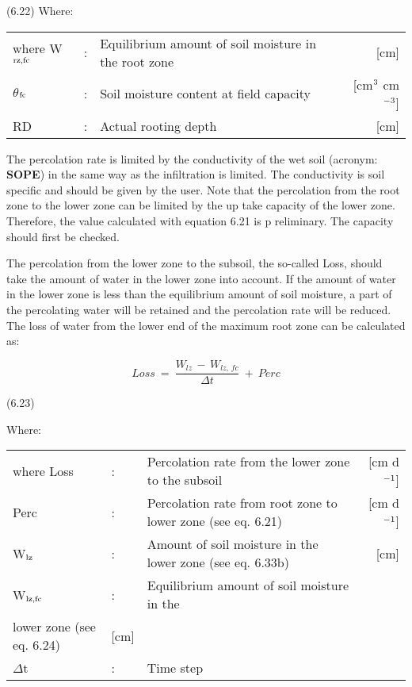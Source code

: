  
\strut\hfill (6.22)
Where:\\
\begin{tabularx}{\textwidth}{llXr}



where W$_{{\rm rz,fc}}$ &:& Equilibrium amount of soil moisture in the root zone  & [cm]\\
$\theta$$_{{\rm fc}}$ &:& Soil moisture content at field capacity  & [cm$^{{\rm 3}}$ cm$^{{\rm -3}}$]\\
RD &:& Actual rooting depth  & [cm]
\end{tabularx}



The percolation rate is limited by the conduc\-tivity of the wet soil (acronym: {\bf SOPE}) in the
same way as the infiltration is limited. The conductivity is soil specific and should be
given by the user. Note that the percolation from the root zone to the lower zone can be
limited by the up take capacity of the lower zone. Therefore, the value calculated with 
equation 6.21 is p reliminary. The capacity should first be checked.



The percolation from the lower zone to the subsoil, the so-called Loss, should take the
amount of water in the lower zone into account. If the amount of water in the lower zone
is less than the equilibrium amount of soil moisture, a part of the percolating water will
be retained and the percolation rate will be reduced. The loss of water from the lower end
of the maximum root zone can be calculated as:

\begin{equation}
Loss ~=~{\frac{W _{lz} \, -\, W _{lz,\, fc} }{\Delta t}} ~+~ Perc
\end{equation}

 
\strut\hfill (6.23)

Where:\\
\begin{tabularx}{\textwidth}{llXr}



where Loss &:& Percolation rate from the lower zone to the subsoil   & [cm d$^{{\rm -1}}$]\\
Perc &:& Percolation rate from root zone to lower zone (see eq. 6.21)  & [cm d$^{{\rm -1}}$]\\
W$_{{\rm lz}}$ &:& Amount of soil moisture in the lower zone (see eq. 6.33b)  & [cm]\\
W$_{{\rm lz,fc}}$ &:& Equilibrium amount of soil moisture in the\\
   lower zone (see eq. 6.24)  & [cm]\\
$\Delta$t &:& Time step   
\end{tabularx}



